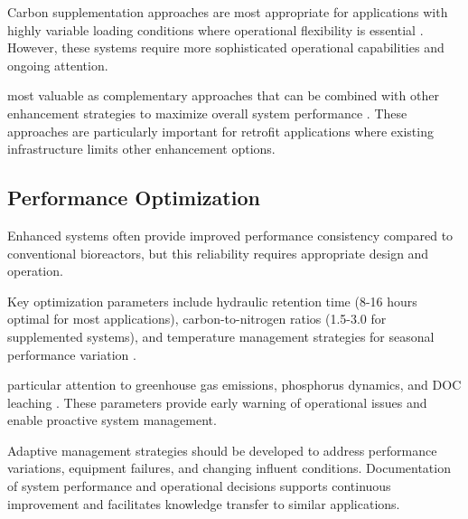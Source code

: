 \documentclass[12pt,a4paper]{article}
\begin{document}
Carbon supplementation approaches are most appropriate for applications with highly variable loading conditions where operational flexibility is essential \citep{RN289}.  However, these systems require more sophisticated operational capabilities and ongoing attention.

 most valuable as complementary approaches that can be combined with other enhancement strategies to maximize overall system performance \citep{RN242, RN228}. These approaches are particularly important for retrofit applications where existing infrastructure limits other enhancement options.

\subsection{Performance Optimization}

 Enhanced systems often provide improved performance consistency compared to conventional bioreactors, but this reliability requires appropriate design and operation.

Key optimization parameters include hydraulic retention time (8-16 hours optimal for most applications), carbon-to-nitrogen ratios (1.5-3.0 for supplemented systems), and temperature management strategies for seasonal performance variation \citep{RN312}. 

 particular attention to greenhouse gas emissions, phosphorus dynamics, and DOC leaching \citep{RN629, RN310, RN312}. These parameters provide early warning of operational issues and enable proactive system management.

Adaptive management strategies should be developed to address performance variations, equipment failures, and changing influent conditions.  Documentation of system performance and operational decisions supports continuous improvement and facilitates knowledge transfer to similar applications.
\end{document}
